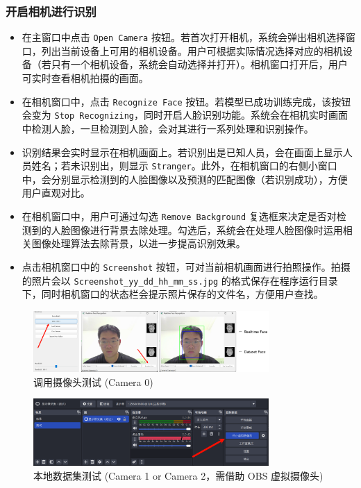 \documentclass{article}
\begin{document}
\subsubsection{开启相机进行识别}
\begin{itemize}
    \item 在主窗口中点击 \texttt{Open Camera} 按钮。若首次打开相机，系统会弹出相机选择窗口，列出当前设备上可用的相机设备。用户可根据实际情况选择对应的相机设备（若只有一个相机设备，系统会自动选择并打开）。相机窗口打开后，用户可实时查看相机拍摄的画面。
    \item 在相机窗口中，点击 \texttt{Recognize Face} 按钮。若模型已成功训练完成，该按钮会变为 \texttt{Stop Recognizing}，同时开启人脸识别功能。系统会在相机实时画面中检测人脸，一旦检测到人脸，会对其进行一系列处理和识别操作。
    \item 识别结果会实时显示在相机画面上。若识别出是已知人员，会在画面上显示人员姓名；若未识别出，则显示 \texttt{Stranger}。此外，在相机窗口的右侧小窗口中，会分别显示检测到的人脸图像以及预测的匹配图像（若识别成功），方便用户直观对比。
    \item 在相机窗口中，用户可通过勾选 \texttt{Remove Background} 复选框来决定是否对检测到的人脸图像进行背景去除处理。勾选后，系统会在处理人脸图像时运用相关图像处理算法去除背景，以进一步提高识别效果。
    \item 点击相机窗口中的 \texttt{Screenshot} 按钮，可对当前相机画面进行拍照操作。拍摄的照片会以 \texttt{Screenshot\_yy\_dd\_hh\_mm\_ss.jpg} 的格式保存在程序运行目录下，同时相机窗口的状态栏会提示照片保存的文件名，方便用户查找。
\end{itemize}

\begin{figure}[H]
    \centering
    \includegraphics[width=0.8\textwidth]{Img/PixPin_2025-03-09_00-59-57.png}
    \caption{调用摄像头测试 (Camera 0)}
\end{figure}

\begin{figure}[H]
    \centering
    \includegraphics[width=0.8\textwidth]{Img/PixPin_2025-03-09_10-58-44.png}
    \caption{本地数据集测试 (Camera 1 or Camera 2，需借助 OBS 虚拟摄像头)}
\end{figure}
\end{document}
